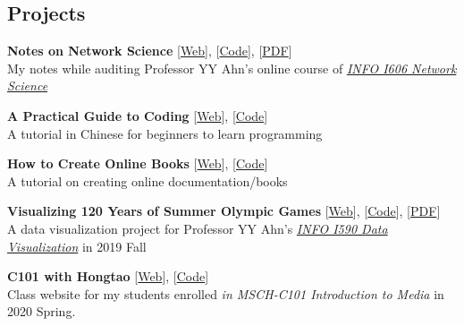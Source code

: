 \documentclass[margin,line, 10pt]{res}
\begin{document}
\begin{resume}

\section{\sc Projects}
{\bf Notes on Network Science}{\hspace{2em} [\href{https://netsci.hongtaoh.com/}{Web}], [\href{https://github.com/hongtaoh/netsci-notes}{Code}], 
[\href{https://netsci.hongtaoh.com/netsci.pdf}{PDF}]} \\
My notes while auditing Professor YY Ahn's online course of \href{https://github.com/yy/netsci-course}{\emph{INFO I606 Network Science} }

{\bf A Practical Guide to Coding}{\hspace{2em} [\href{https://intro2code.hongtaoh.com/}{Web}], [\href{https://github.com/hongtaoh/intro2code}{Code}]}\\
A tutorial in Chinese for beginners to learn programming

{\bf How to Create Online Books}{\hspace{2em} [\href{https://onlinebook.hongtaoh.com/}{Web}], [\href{https://github.com/hongtaoh/onlinebook}{Code}]}\\
A tutorial on creating online documentation/books

{\bf Visualizing 120 Years of Summer Olympic Games}{\hspace{2em} [\href{https://olymvis.hongtaoh.com/}{Web}], [\href{https://github.com/hongtaoh/olymvis-data}{Code}],
[\href{https://raw.githubusercontent.com/hongtaoh/olymvis/master/static/tex-pdf/fang_hao_olymvis.pdf}{PDF}]} \\
A data visualization project for Professor YY Ahn's \href{http://yyahn.com/dviz-course/}{\emph{INFO I590 Data Visualization}} in 2019 Fall

{\textbf {C101 with Hongtao}}{ \hspace{2em} [\href{https://c101.hongtaoh.com/}{Web}], [\href{https://github.com/hongtaoh/c101}{Code}]} \\
Class website for my students enrolled \textit{in MSCH-C101 Introduction to Media} in 2020 Spring.


\end{resume}
\end{document}
